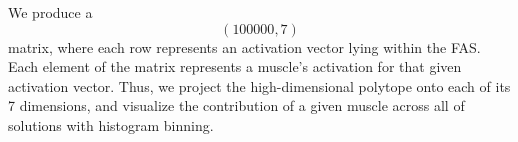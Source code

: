 \begin{results}

We produce a $$(100000,7)$$ matrix, where each row represents an activation vector lying within the FAS. Each element of the matrix represents a muscle's activation for that given activation vector. Thus, we project the high-dimensional polytope onto each of its 7 dimensions, and visualize the contribution of a given muscle across all of solutions with histogram binning.



\end{results}